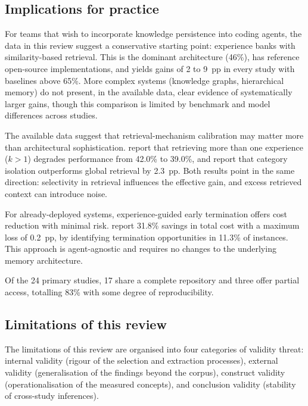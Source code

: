 \subsection{Implications for practice}
\label{sec:implicacoes-pratica}

For teams that wish to incorporate knowledge persistence into coding
agents, the data in this review suggest a conservative starting point:
experience banks with similarity-based retrieval.
This is the dominant architecture (46\%), has reference open-source
implementations, and yields gains of 2 to 9~pp in every study with
baselines above 65\%.
More complex systems (knowledge graphs, hierarchical memory) do not
present, in the available data, clear evidence of systematically larger
gains, though this comparison is limited by benchmark and model
differences across studies.

The available data suggest that retrieval-mechanism calibration may
matter more than architectural sophistication.
\citet{chen2025sweexp} report that retrieving more than one experience
($k > 1$) degrades performance from 42.0\% to 39.0\%, and
\citet{shen2026structurally} report that category isolation outperforms
global retrieval by 2.3~pp.
Both results point in the same direction: selectivity in retrieval
influences the effective gain, and excess retrieved context can
introduce noise.

For already-deployed systems, experience-guided early termination
offers cost reduction with minimal risk.
\citet{guo2026eet} report 31.8\% savings in total cost with a maximum
loss of 0.2~pp, by identifying termination opportunities in 11.3\% of
instances.
This approach is agent-agnostic and requires no changes to the
underlying memory architecture.

Of the 24 primary studies, 17 share a complete repository and three
offer partial access, totalling 83\% with some degree of
reproducibility.

\subsection{Limitations of this review}
\label{sec:limitacoes}

The limitations of this review are organised into four categories of
validity threat: internal validity (rigour of the selection and
extraction processes), external validity (generalisation of the
findings beyond the corpus), construct validity (operationalisation of
the measured concepts), and conclusion validity (stability of
cross-study inferences).

